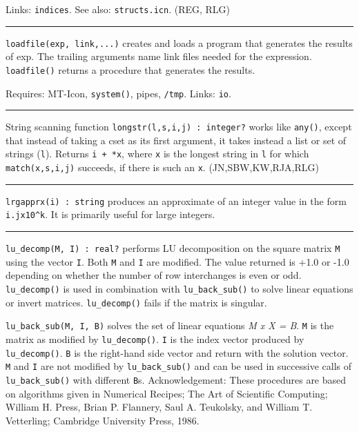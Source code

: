 Links: \texttt{indices}. See also: \texttt{structs.icn}. (REG, RLG)

\vspace{0.25cm}\hrule{}

\texttt{loadfile(exp, link,...)} creates and loads a program that
generates the results of exp. The trailing arguments name link files
needed for the expression. \texttt{loadfile()} returns a procedure that
generates the results.

Requires: MT-Icon, \texttt{system()}, pipes, \texttt{/tmp}. Links:
\texttt{io}. 

\vspace{0.25cm}\hrule{}

String scanning function \texttt{longstr(l,s,i,j) : integer?} works like
\texttt{any()}, except that instead of taking a cset as its first
argument, it takes instead a list or set of strings (\texttt{l}).
Returns \texttt{i + *x}, where \texttt{x} is the longest string in \texttt{l} for which \texttt{match(x,s,i,j)}
succeeds, if there is such an \texttt{x}. (JN,SBW,KW,RJA,RLG)

\vspace{0.25cm}\hrule{}

\texttt{lrgapprx(i) : string} produces an approximate of an integer
value in the form \texttt{i.jx10\^{}k}. It is primarily useful for
large integers. 

\vspace{0.25cm}\hrule{}

\texttt{lu\_decomp(M, I) : real?} performs LU
decomposition on the square matrix \texttt{M} using the vector
\texttt{I}. Both \texttt{M} and \texttt{I} are modified. The value
returned is +1.0 or -1.0 depending on whether the number of row
interchanges is even or odd. \texttt{lu\_decomp()} is used in
combination with \texttt{lu\_back\_sub()} to solve linear equations or
invert matrices. \texttt{lu\_decomp()} fails if the matrix is singular.

\texttt{lu\_back\_sub(M, I, B)} solves the set of linear equations
\textit{M x X = B}. \texttt{M} is the matrix as modified by
\texttt{lu\_decomp()}. \texttt{I} is the index vector produced by
\texttt{lu\_decomp()}. \texttt{B} is the right-hand side vector and
return with the solution vector. \texttt{M} and \texttt{I} are not
modified by \texttt{lu\_back\_sub()} and can be used in successive
calls of \texttt{lu\_back\_sub()} with different \texttt{B}s.
Acknowledgement: These procedures are based on algorithms given in
{\textquotedbl}Numerical Recipes; The Art of Scientific
Computing{\textquotedbl}; William H. Press, Brian P. Flannery, Saul A.
Teukolsky, and William T. Vetterling; Cambridge University Press, 1986.


